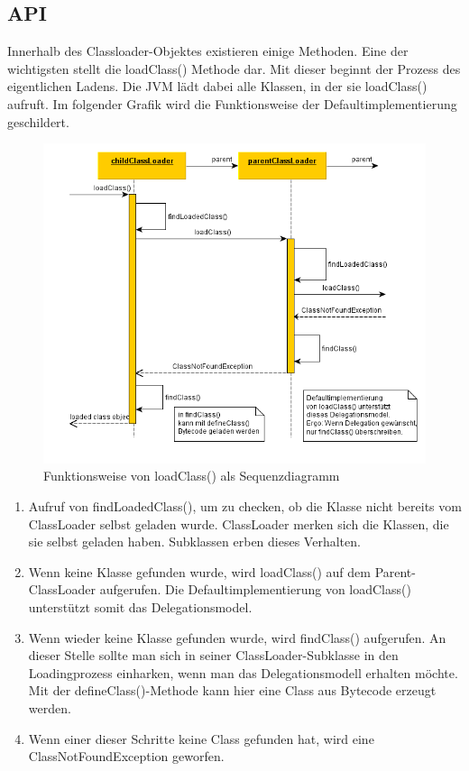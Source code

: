 \documentclass[a4paper,14pt]{scrreprt}
\begin{document}
\subsection{API}
Innerhalb des Classloader-Objektes existieren einige Methoden. Eine der wichtigsten stellt die loadClass() Methode dar. Mit dieser beginnt der Prozess des eigentlichen Ladens. Die JVM lädt dabei alle Klassen, in der sie loadClass() aufruft. Im folgender Grafik wird die Funktionsweise der Defaultimplementierung geschildert.
\begin{figure}[h!]
\centering
\includegraphics[width=0.8\linewidth]{./classloader-seq}
\caption[Funktionsweise von loadClass() als UML-Sequenzdiagramm]{Funktionsweise von loadClass() als Sequenzdiagramm}
\label{fig:classloader-seq}
\end{figure}
\begin{enumerate}
\item Aufruf von findLoadedClass(), um zu checken, ob die Klasse nicht bereits vom ClassLoader selbst geladen wurde. ClassLoader merken sich die Klassen, die sie selbst geladen haben. Subklassen erben dieses Verhalten.
\item Wenn keine Klasse gefunden wurde, wird loadClass() auf dem Parent-ClassLoader aufgerufen. Die Defaultimplementierung von loadClass() unterstützt somit das Delegationsmodel.
\item Wenn wieder keine Klasse gefunden wurde, wird findClass() aufgerufen. An dieser Stelle sollte man sich in seiner ClassLoader-Subklasse in den Loadingprozess einharken, wenn man das Delegationsmodell erhalten möchte. Mit der defineClass()-Methode kann hier eine Class aus Bytecode erzeugt werden.
\item Wenn einer dieser Schritte keine Class gefunden hat, wird eine ClassNotFoundException geworfen.
\end{enumerate}
\cite{jvmClass}
\end{document}
